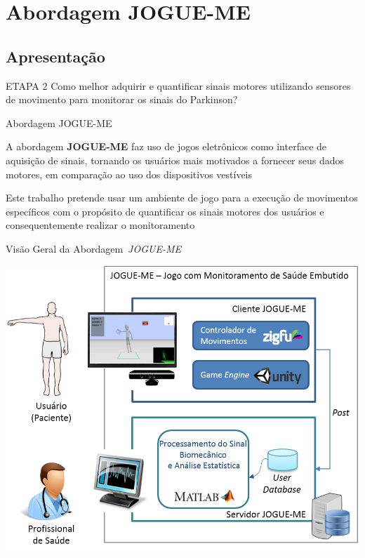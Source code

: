 \documentclass{beamer}
\begin{document}
\section{Abordagem JOGUE-ME}


\subsection{Apresentação}
\begin{frame}
  \begin{block}{ETAPA 2}
   Como melhor adquirir e quantificar sinais motores utilizando sensores de movimento para monitorar os sinais do Parkinson?
  \end{block}
\end{frame}

\begin{frame}{Abordagem JOGUE-ME}
    \begin{block}{}
    A abordagem \textbf{JOGUE-ME} faz uso de jogos eletrônicos como interface de aquisição de sinais, tornando os usuários mais motivados a fornecer seus dados motores, em comparação ao uso dos dispositivos vestíveis
    \end{block}
    
    
    \begin{block}{}
    Este trabalho pretende usar um ambiente de jogo para a execução de movimentos específicos com o propósito de quantificar os sinais motores dos usuários e consequentemente realizar o monitoramento
    \end{block}
\end{frame}

\begin{frame}{Visão Geral da Abordagem~\textit{JOGUE-ME}}
  \begin{block}{}
      \center \includegraphics[height=1.8 in]{img/visaosistema.png}
  \end{block}
\end{frame}
\end{document}
